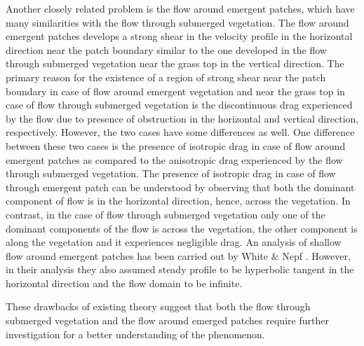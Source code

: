 \documentclass[12pt]{report}   %
\begin{document}
Another closely related problem is the flow around emergent patches, which have many similarities with the flow through submerged vegetation. The flow around emergent patches develops a strong shear in the velocity profile in the horizontal direction near the patch boundary similar to the one developed in the flow through submerged vegetation near the grass top in the vertical direction. The primary reason for the existence of a region of strong shear near the patch boundary in case of flow around emergent vegetation and near the grass top in case of flow through submerged vegetation is the discontinuous drag
experienced by the flow due to presence of obstruction in the horizontal and vertical direction, respectively. However, the two cases have some differences as well. One difference between these two cases is the presence of isotropic drag in case of flow around emergent patches as compared to the anisotropic drag experienced by the flow through submerged vegetation.
The presence of isotropic drag in case of flow through emergent patch can be understood by observing that both the dominant component of flow is in the horizontal direction, hence, across the vegetation. In contrast, in the case of flow through submerged vegetation only one of the dominant components of the flow is across the  vegetation, the other component is along the vegetation and it experiences negligible drag. An analysis of shallow flow around emergent patches has been carried out by White $\&$ Nepf \cite{White07}. However, in their analysis they also 
assumed steady profile to be hyperbolic 
tangent in the horizontal direction and the flow domain to be infinite.



These drawbacks of existing theory suggest that both the flow through submerged vegetation and the flow around emerged patches require further investigation for a better understanding of the phenomenon.
\end{document}
